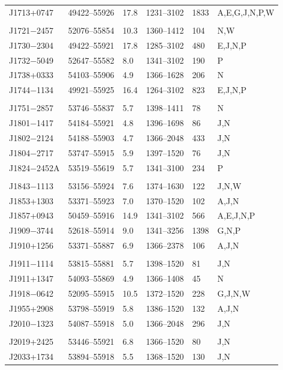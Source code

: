 \begin{table}
\begin{tabular}{p{1.3cm}lp{0.4cm}llp{1cm}}
J1713+0747 & 49422--55926  & 17.8  & 1231--3102  & 1833  & A,E,G,J,N,P,W \\
\\
J1721$-$2457 & 52076--55854  & 10.3  & 1360--1412  & 104  & N,W \\
J1730$-$2304 & 49422--55921  & 17.8  & 1285--3102  & 480  & E,J,N,P \\
J1732$-$5049 & 52647--55582  & 8.0  & 1341--3102  & 190  & P \\
J1738+0333 & 54103--55906  & 4.9  & 1366--1628  & 206  & N \\
J1744$-$1134 & 49921--55925  & 16.4  & 1264--3102  & 823  & E,J,N,P \\
\\
J1751$-$2857 & 53746--55837  & 5.7  & 1398--1411  & 78  & N \\
J1801$-$1417 & 54184--55921  & 4.8  & 1396--1698  & 86  & J,N \\
J1802$-$2124 & 54188--55903  & 4.7  & 1366--2048  & 433  & J,N \\
J1804$-$2717 & 53747--55915  & 5.9  & 1397--1520  & 76  & J,N \\
J1824$-$2452A & 53519--55619  & 5.7  & 1341--3100  & 234  & P \\
\\
J1843$-$1113 & 53156--55924  & 7.6  & 1374--1630  & 122  & J,N,W \\
J1853+1303 & 53371--55923  & 7.0  & 1370--1520  & 102  & A,J,N \\
J1857+0943 & 50459--55916  & 14.9  & 1341--3102  & 566  & A,E,J,N,P \\
J1909$-$3744 & 52618--55914  & 9.0  & 1341--3256  & 1398  & G,N,P \\
J1910+1256 & 53371--55887  & 6.9  & 1366--2378  & 106  & A,J,N \\
\\
J1911$-$1114 & 53815--55881  & 5.7  & 1398--1520  & 81  & J,N \\
J1911+1347 & 54093--55869  & 4.9  & 1366--1408  & 45  & N \\
J1918$-$0642 & 52095--55915  & 10.5  & 1372--1520  & 228  & G,J,N,W \\
J1955+2908 & 53798--55919  & 5.8  & 1386--1520  & 132  & A,J,N \\
J2010$-$1323 & 54087--55918  & 5.0  & 1366--2048  & 296  & J,N \\
\\
J2019+2425 & 53446--55921  & 6.8  & 1366--1520  & 80  & J,N \\
J2033+1734 & 53894--55918  & 5.5  & 1368--1520  & 130  & J,N \\

\end{tabular}
\end{table}
